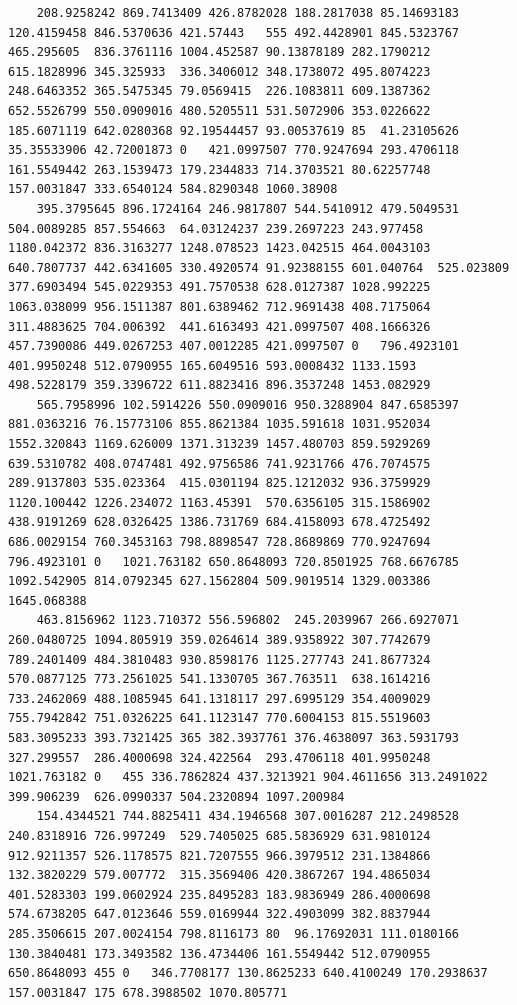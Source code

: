 \documentclass[UTF8]{ctexart}
\begin{document}
\begin{lstlisting}
	208.9258242	869.7413409	426.8782028	188.2817038	85.14693183	120.4159458	846.5370636	421.57443	555	492.4428901	845.5323767	465.295605	836.3761116	1004.452587	90.13878189	282.1790212	615.1828996	345.325933	336.3406012	348.1738072	495.8074223	248.6463352	365.5475345	79.0569415	226.1083811	609.1387362	652.5526799	550.0909016	480.5205511	531.5072906	353.0226622	185.6071119	642.0280368	92.19544457	93.00537619	85	41.23105626	35.35533906	42.72001873	0	421.0997507	770.9247694	293.4706118	161.5549442	263.1539473	179.2344833	714.3703521	80.62257748	157.0031847	333.6540124	584.8290348	1060.38908
	395.3795645	896.1724164	246.9817807	544.5410912	479.5049531	504.0089285	857.554663	64.03124237	239.2697223	243.977458	1180.042372	836.3163277	1248.078523	1423.042515	464.0043103	640.7807737	442.6341605	330.4920574	91.92388155	601.040764	525.023809	377.6903494	545.0229353	491.7570538	628.0127387	1028.992225	1063.038099	956.1511387	801.6389462	712.9691438	408.7175064	311.4883625	704.006392	441.6163493	421.0997507	408.1666326	457.7390086	449.0267253	407.0012285	421.0997507	0	796.4923101	401.9950248	512.0790955	165.6049516	593.0008432	1133.1593	498.5228179	359.3396722	611.8823416	896.3537248	1453.082929
	565.7958996	102.5914226	550.0909016	950.3288904	847.6585397	881.0363216	76.15773106	855.8621384	1035.591618	1031.952034	1552.320843	1169.626009	1371.313239	1457.480703	859.5929269	639.5310782	408.0747481	492.9756586	741.9231766	476.7074575	289.9137803	535.023364	415.0301194	825.1212032	936.3759929	1120.100442	1226.234072	1163.45391	570.6356105	315.1586902	438.9191269	628.0326425	1386.731769	684.4158093	678.4725492	686.0029154	760.3453163	798.8898547	728.8689869	770.9247694	796.4923101	0	1021.763182	650.8648093	720.8501925	768.6676785	1092.542905	814.0792345	627.1562804	509.9019514	1329.003386	1645.068388
	463.8156962	1123.710372	556.596802	245.2039967	266.6927071	260.0480725	1094.805919	359.0264614	389.9358922	307.7742679	789.2401409	484.3810483	930.8598176	1125.277743	241.8677324	570.0877125	773.2561025	541.1330705	367.763511	638.1614216	733.2462069	488.1085945	641.1318117	297.6995129	354.4009029	755.7942842	751.0326225	641.1123147	770.6004153	815.5519603	583.3095233	393.7321425	365	382.3937761	376.4638097	363.5931793	327.299557	286.4000698	324.422564	293.4706118	401.9950248	1021.763182	0	455	336.7862824	437.3213921	904.4611656	313.2491022	399.906239	626.0990337	504.2320894	1097.200984
	154.4344521	744.8825411	434.1946568	307.0016287	212.2498528	240.8318916	726.997249	529.7405025	685.5836929	631.9810124	912.9211357	526.1178575	821.7207555	966.3979512	231.1384866	132.3820229	579.007772	315.3569406	420.3867267	194.4865034	401.5283303	199.0602924	235.8495283	183.9836949	286.4000698	574.6738205	647.0123646	559.0169944	322.4903099	382.8837944	285.3506615	207.0024154	798.8116173	80	96.17692031	111.0180166	130.3840481	173.3493582	136.4734406	161.5549442	512.0790955	650.8648093	455	0	346.7708177	130.8625233	640.4100249	170.2938637	157.0031847	175	678.3988502	1070.805771

\end{lstlisting}
\end{document}
